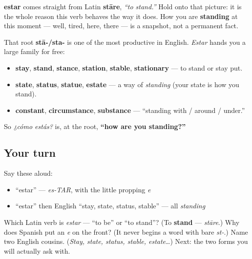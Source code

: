 \begin{cousinweb}
\textbf{estar} comes straight from Latin \textbf{stāre}, \emph{\textquotedblleft{}to stand.\textquotedblright{}} Hold onto that picture: it is the whole reason this verb behaves the way it does. How you are \textbf{standing} at this moment — well, tired, here, there — is a snapshot, not a permanent fact.

That root \textbf{stā-/sta-} is one of the most productive in English. \emph{Estar} hands you a large family for free:

\begin{itemize}
\raggedright
  \item \textbf{stay}, \textbf{stand}, \textbf{stance}, \textbf{station}, \textbf{stable}, \textbf{stationary} — to stand or stay put.
  \item \textbf{state}, \textbf{status}, \textbf{statue}, \textbf{estate} — a way of \emph{standing} (your state is how you stand).
  \item \textbf{constant}, \textbf{circumstance}, \textbf{substance} — \textquotedblleft{}standing with / around / under.\textquotedblright{}
\end{itemize}

So \emph{¿cómo estás?} is, at the root, \textbf{\textquotedblleft{}how are you standing?\textquotedblright{}}
\end{cousinweb}

\subsection*{Your turn}
Say these aloud:

\begin{itemize}
\raggedright
  \item \textquotedblleft{}estar\textquotedblright{} — \emph{es-TAR}, with the little propping \emph{e}
  \item \textquotedblleft{}estar\textquotedblright{} then English \textquotedblleft{}stay, state, status, stable\textquotedblright{} — all \emph{standing}
\end{itemize}

\begin{tcolorbox}[breakable,colback=teal!4,colframe=teal!35!black,title={Before you move on}]
Which Latin verb is \emph{estar} — \textquotedblleft{}to be\textquotedblright{} or \textquotedblleft{}to stand\textquotedblright{}? (To \textbf{stand} — \emph{stāre}.) Why does Spanish put an \emph{e} on the front? (It never begins a word with bare \emph{st-}.) Name two English cousins. (\emph{Stay, state, status, stable, estate}…) Next: the two forms you will actually ask with.
\end{tcolorbox}
